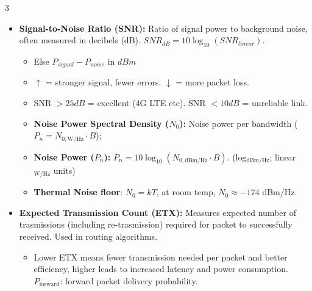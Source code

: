 \documentclass[a4paper, 9pt, landscape]{extarticle}
\begin{document}
\begin{multicols*}{3}
\begin{itemize}
  \item \textbf{Signal-to-Noise Ratio (SNR):} Ratio of signal power to background noise, often measured in decibels (dB). $SNR_{dB} = 10 \log_{10}(SNR_{linear})$. 
  
  \centerline{
  }
  \begin{itemize}
    \item Else $P_{signal} - P_{noise}$ in $dBm$
    \item $\uparrow$ = stronger signal, fewer errors. $\downarrow$ = more packet loss. 
    \item SNR $> 25 dB$ = excellent (4G LTE etc). SNR $< 10 dB$ = unreliable link.
    \item \textbf{Noise Power Spectral Density ($N_0$):} Noise power per bandwidth ($P_n = N_{0,\text{W/Hz}} \cdot B$); 
    \item \textbf{Noise Power ($P_n$):} $P_n = 10 \log_{10}(N_{0,\text{dBm/Hz}} \cdot B)$. (log$_{\text{dBm}/\text{Hz}}$; linear$_{\text{W}/\text{Hz}}$ units)
    \item \textbf{Thermal Noise floor}: $N_0 = k T$, at room temp, $N_0 \approx -174$ dBm/Hz.
  \end{itemize}

  \item \textbf{Expected Transmission Count (ETX):} Measures expected number of trasmissions (including re-trasmission) required for packet to successfully received. Used in routing algorithms.
  
  \centerline{
  }
  \begin{itemize}
    \item Lower ETX means fewer transmission needed per packet and better efficiency, higher leads to increased latency and power consumption. $P_{\text{forward}}$: forward packet delivery probability.
  \end{itemize}             
\end{itemize}


\end{multicols*}
\end{document}
